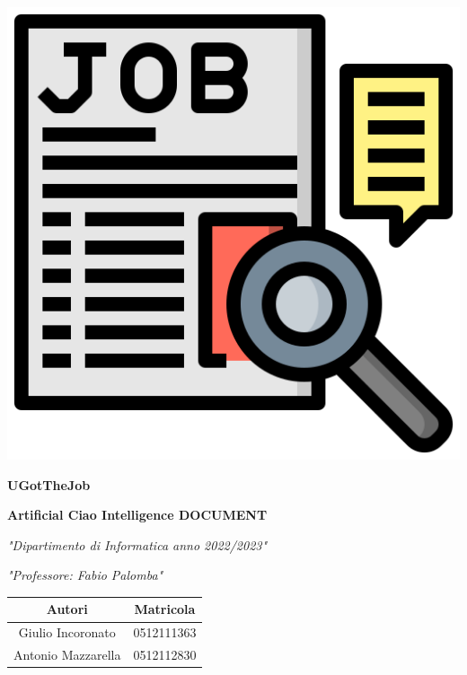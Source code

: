 \documentclass[12pt]{article}
\author{Giulio Incoronato, Antonio Mazzarella}
\newcommand{\mainname}{UGotTheJob}
\begin{document}
\thispagestyle{empty}

\begin{center}%
    \includegraphics[scale=0.6]{job_seeking.png}

    \vspace{1cm}

    \textbf{\huge{\mainname}} %

    \vspace{0.5cm}

    \fontsize{17}{16}
    \textbf{Artificial Ciao Intelligence DOCUMENT}

    \textit{"Dipartimento di Informatica anno 2022/2023"}

    \textit{"Professore: Fabio Palomba"}

    \vspace{1.8cm}


    \begin{table}[ht]
        \fontsize{17}{12}\selectfont
        \centering
        \setlength{\arrayrulewidth}{2pt}
        \setlength{\tabcolsep}{5pt}
        \def\arraystretch{1.8}
        \begin{tabular}{ c | c }
            \textbf{Autori}    & \textbf{Matricola} \\
            \hline
            Giulio Incoronato  & 0512111363         \\
            Antonio Mazzarella & 0512112830         \\
        \end{tabular}
    \end{table}
\end{center}
\end{document}
